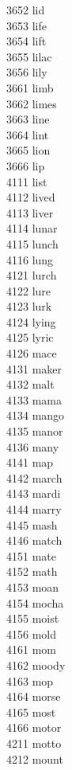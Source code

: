 3652 lid \\
3653 life \\
3654 lift \\
3655 lilac \\
3656 lily \\
3661 limb \\
3662 limes \\
3663 line \\
3664 lint \\
3665 lion \\
3666 lip \\
4111 list \\
4112 lived \\
4113 liver \\
4114 lunar \\
4115 lunch \\
4116 lung \\
4121 lurch \\
4122 lure \\
4123 lurk \\
4124 lying \\
4125 lyric \\
4126 mace \\
4131 maker \\
4132 malt \\
4133 mama \\
4134 mango \\
4135 manor \\
4136 many \\
4141 map \\
4142 march \\
4143 mardi \\
4144 marry \\
4145 mash \\
4146 match \\
4151 mate \\
4152 math \\
4153 moan \\
4154 mocha \\
4155 moist \\
4156 mold \\
4161 mom \\
4162 moody \\
4163 mop \\
4164 morse \\
4165 most \\
4166 motor \\
4211 motto \\
4212 mount \\
